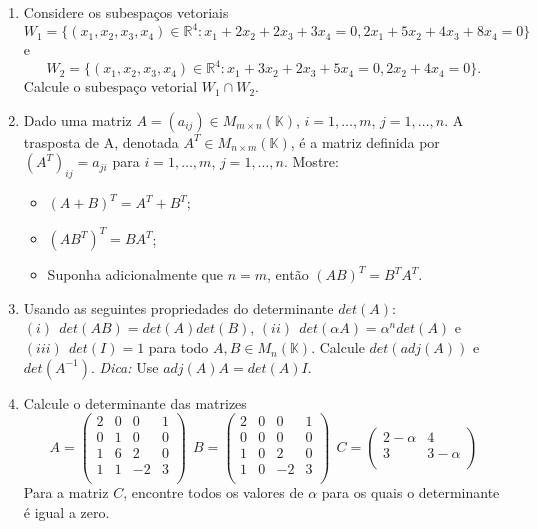 \documentclass{article}
\theoremstyle{plain}
\theoremstyle{obs}
\numberwithin{equation}{section}
\begin{document}
\begin{enumerate}
   \item Considere os subespaços vetoriais   
   $$W_1=\{(x_1,x_2,x_3,x_4) \in \mathbb{R}^{4}: 
   x_1+2x_2+2x_3+3x_4=0, 2x_1+5x_2+4x_3+8x_4=0 \}$$
   e 
   $$W_2=\{(x_1,x_2,x_3,x_4) \in \mathbb{R}^{4}: 
   x_1+3x_2+2x_3+5x_4=0, 2x_2+4x_4=0 \}.$$
   Calcule o subespaço vetorial $W_{1}\cap W_2$.
       
   \item Dado uma matriz $A=(a_{ij}) \in M_{m\times n}(\mathbb{K})$, $i=1,\dots,m$, $j=1,\dots,n$.
   A trasposta de A, denotada $A^{T} \in M_{ n \times m}(\mathbb{K})$, 
   é a matriz 
   definida por $(A^{T})_{ij}=a_{ji}$ para 
   $i=1,\dots,m$, $j=1,\dots,n$. \newline
   Mostre:
      \begin{itemize}
      \item $(A+B)^{T}=A^{T}+B^{T}$;
      \item $(AB^{T})^{T}=BA^{T}$;
      \item Suponha adicionalmente que $n=m$, então 
      $(AB)^{T}=B^{T}A^{T}$.
      \end{itemize}
   \item Usando as seguintes propriedades do determinante $det(A)$: 
   $(i)\ \ det(AB)=det(A)det(B)$, 
   $(ii)\ \ det(\alpha A)=\alpha^{n} det(A)$ e 
   $(iii) \ \ det(I)=1$ para todo
   $A, B \in M_{n}(\mathbb{K})$.
   Calcule $det(adj(A))$ e $det(A^{-1})$.  \newline
   {\it Dica:} Use $adj(A)A=det(A)I$.

   \item Calcule o determinante das matrizes
       $$
       A=
       \begin{pmatrix}
       2 & 0 & 0 & 1 \\
       0 & 1 & 0 & 0 \\
       1 & 6 & 2 & 0 \\
       1 & 1 & -2 & 3 \\
       \end{pmatrix}
       \ \ 
       B=
       \begin{pmatrix}
       2 & 0 & 0 & 1 \\
       0 & 0 & 0 & 0 \\
       1 & 0 & 2 & 0 \\
       1 & 0 & -2 & 3 \\
       \end{pmatrix}
       \ \ 
       C=
       \begin{pmatrix}
       2-\alpha & 4 \\
       3 & 3 - \alpha\\
       \end{pmatrix}
       $$
    Para a matriz $C$, encontre todos os valores de $\alpha$ 
    para os quais o determinante é igual a zero.
    

\end{enumerate}
\end{document}
